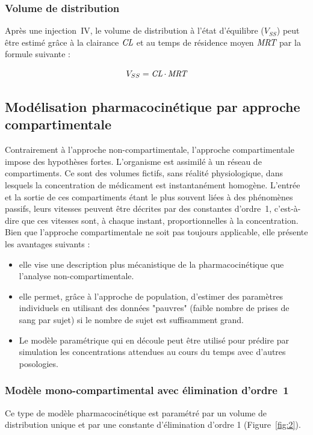 \subsubsection{Volume de distribution}
Après une injection~IV, le volume de distribution à l'état d'équilibre ($V_{SS}$) peut être estimé grâce à la clairance $\operatorname{\textit{CL}}$ et au temps de résidence moyen $\operatorname{\textit{MRT}}$ par la formule suivante :

\begin{equation}
V_{SS} = \operatorname{\textit{CL}} \cdot \operatorname{\textit{MRT}}
\label{eq:12}
\end{equation}

\subsection{Modélisation pharmacocinétique par approche compartimentale}
Contrairement à l'approche non-compartimentale, l'approche compartimentale impose des hypothèses fortes. L'organisme est assimilé à un réseau de compartiments. Ce sont des volumes fictifs, sans réalité physiologique, dans lesquels la concentration de médicament est instantanément homogène. L'entrée et la sortie de ces compartiments étant le plus souvent liées à des phénomènes passifs, leurs vitesses peuvent être décrites par des constantes d'ordre~1, c'est-à-dire que ces vitesses sont, à chaque instant, proportionnelles à la concentration. Bien que l'approche compartimentale ne soit pas toujours applicable, elle présente les avantages suivants :
\begin{itemize}
\item elle vise une description plus mécanistique de la pharmacocinétique que l'analyse non-compartimentale.

\item elle permet, grâce à l'approche de population, d'estimer des paramètres individuels en utilisant des données "pauvres" (faible nombre de prises de sang par sujet) si le nombre de sujet est suffisamment grand.

\item Le modèle paramétrique qui en découle peut être utilisé pour prédire par simulation les concentrations attendues au cours du temps avec d'autres posologies.
\end{itemize}

\subsubsection{Modèle mono-compartimental avec élimination d'ordre~1}
Ce type de modèle pharmacocinétique est paramétré par un volume de distribution unique et par une constante d'élimination d'ordre 1 (Figure~\ref{fig:2}).

